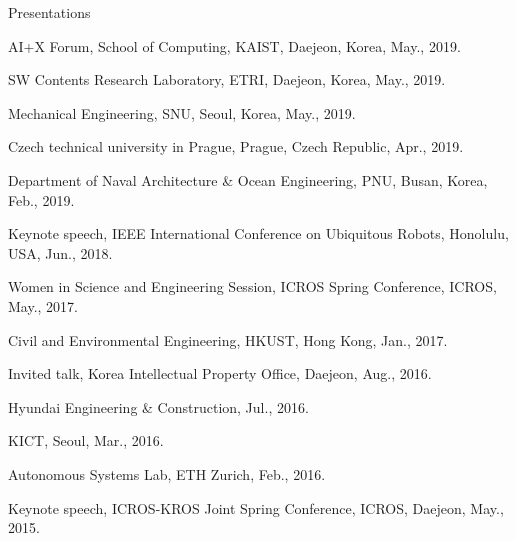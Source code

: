 \begin{rSection}{Presentations}
\begin{pubSubsectionNum}{}
  \item AI+X Forum, School of Computing, \ac{KAIST}, Daejeon, Korea, May., 2019.

  \item SW Contents Research Laboratory, \ac{ETRI}, Daejeon, Korea, May., 2019.

  \item Mechanical Engineering, \ac{SNU}, Seoul, Korea, May., 2019.

  \item Czech technical university in Prague, Prague, Czech Republic, Apr., 2019.

  \item Department of Naval Architecture \& Ocean Engineering, \ac{PNU}, Busan, Korea, Feb., 2019.





  \item Keynote speech, IEEE International Conference on Ubiquitous Robots, Honolulu, USA, Jun., 2018.

  \item Women in Science and Engineering Session, ICROS Spring Conference, \acf{ICROS}, May., 2017.

  \item Civil and Environmental Engineering, \ac{HKUST}, Hong Kong, Jan., 2017.

  \item Invited talk, Korea Intellectual Property Office, Daejeon, Aug., 2016.

  \item Hyundai Engineering \& Construction, Jul., 2016.

  \item \ac{KICT}, Seoul, Mar., 2016.

  \item Autonomous Systems Lab, ETH Zurich, Feb., 2016.

  \item Keynote speech, ICROS-KROS Joint Spring Conference, \ac{ICROS}, Daejeon, May., 2015.


\end{pubSubsectionNum}
\end{rSection}
